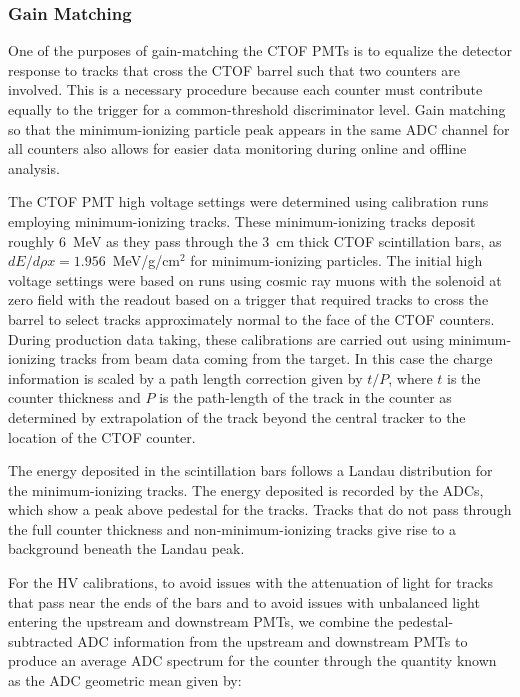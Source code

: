 \documentclass{elsart}
\begin{document}
\subsubsection{Gain Matching}
\label{gain-matching}

One of the purposes of gain-matching the CTOF PMTs is to equalize the detector response to tracks that
cross the CTOF barrel such that two counters are involved. This is a necessary procedure because each
counter must contribute equally to the trigger for a common-threshold discriminator level. Gain matching
so that the minimum-ionizing particle peak appears in the same ADC channel for all counters also allows for
easier data monitoring during online and offline analysis.

The CTOF PMT high voltage settings were determined using calibration runs employing minimum-ionizing
tracks. These minimum-ionizing tracks deposit roughly 6~MeV as they pass through the 3~cm thick CTOF
scintillation bars, as $dE/d\rho x = 1.956$~MeV/g/cm$^2$ for minimum-ionizing particles. The initial high
voltage settings were based on runs using cosmic ray muons with the solenoid at zero field with the readout
based on a trigger that required tracks to cross the barrel to select tracks approximately normal to the
face of the CTOF counters. During production data taking, these calibrations are carried out using
minimum-ionizing tracks from beam data coming from the target. In this case the charge information is
scaled by a path length correction given by $t/P$, where $t$ is the counter thickness and $P$ is the
path-length of the track in the counter as determined by extrapolation of the track beyond the central
tracker to the location of the CTOF counter.

The energy deposited in the scintillation bars follows a Landau distribution for the minimum-ionizing tracks.
The energy deposited is recorded by the ADCs, which show a peak above pedestal for the tracks. Tracks
that do not pass through the full counter thickness and non-minimum-ionizing tracks give rise to a background
beneath the Landau peak.

For the HV calibrations, to avoid issues with the attenuation of light for tracks that pass near the ends of
the bars and to avoid issues with unbalanced light entering the upstream and downstream PMTs, we combine
the pedestal-subtracted ADC information from the upstream and downstream PMTs to produce an average
ADC spectrum for the counter through the quantity known as the ADC geometric mean given by:
\end{document}
